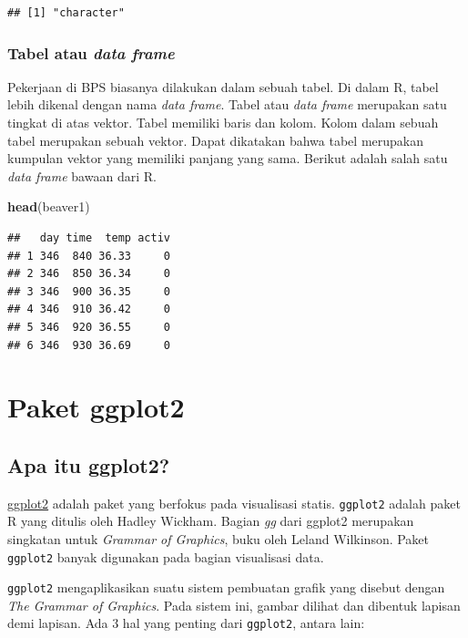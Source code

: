 \documentclass[]{book}
\newenvironment{Shaded}{\begin{snugshade}}{\end{snugshade}}
\newcommand{\KeywordTok}[1]{\textcolor[rgb]{0.13,0.29,0.53}{\textbf{#1}}}
\newcommand{\NormalTok}[1]{#1}
\begin{document}
\begin{verbatim}
## [1] "character"
\end{verbatim}

\subsection{\texorpdfstring{Tabel atau \emph{data
frame}}{Tabel atau data frame}}\label{tabel-atau-data-frame}

Pekerjaan di BPS biasanya dilakukan dalam sebuah tabel. Di dalam R,
tabel lebih dikenal dengan nama \emph{data frame}. Tabel atau \emph{data
frame} merupakan satu tingkat di atas vektor. Tabel memiliki baris dan
kolom. Kolom dalam sebuah tabel merupakan sebuah vektor. Dapat dikatakan
bahwa tabel merupakan kumpulan vektor yang memiliki panjang yang sama.
Berikut adalah salah satu \emph{data frame} bawaan dari R.

\begin{Shaded}
\begin{Highlighting}[]
\KeywordTok{head}\NormalTok{(beaver1)}
\end{Highlighting}
\end{Shaded}

\begin{verbatim}
##   day time  temp activ
## 1 346  840 36.33     0
## 2 346  850 36.34     0
## 3 346  900 36.35     0
## 4 346  910 36.42     0
## 5 346  920 36.55     0
## 6 346  930 36.69     0
\end{verbatim}

\chapter{Paket ggplot2}\label{ggplot2}

\section{Apa itu ggplot2?}\label{apa-itu-ggplot2}

\href{https://ggplot2.tidyverse.org/}{ggplot2} adalah paket yang
berfokus pada visualisasi statis. \texttt{ggplot2} adalah paket R yang
ditulis oleh Hadley Wickham. Bagian \emph{gg} dari ggplot2 merupakan
singkatan untuk \emph{Grammar of Graphics}, buku oleh Leland Wilkinson.
Paket \texttt{ggplot2} banyak digunakan pada bagian visualisasi data.

\texttt{ggplot2} mengaplikasikan suatu sistem pembuatan grafik yang
disebut dengan \emph{The Grammar of Graphics}. Pada sistem ini, gambar
dilihat dan dibentuk lapisan demi lapisan. Ada 3 hal yang penting dari
\texttt{ggplot2}, antara lain:
\end{document}
